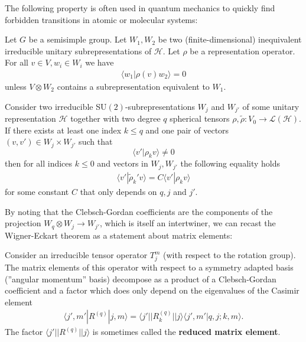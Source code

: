     The following property is often used in quantum mechanics to quickly find forbidden transitions in atomic or molecular systems:
    \begin{property}
        Let $G$ be a semisimple group. Let $W_1, W_2$ be two (finite-dimensional) inequivalent irreducible unitary subrepresentations of $\mathcal{H}$. Let $\rho$ be a representation operator. For all $v\in V, w_i\in W_i$ we have
        \begin{gather}
            \langle w_1|\rho(v)w_2\rangle = 0
        \end{gather}
        unless $V\otimes W_2$ contains a subrepresentation equivalent to $W_1$.
    \end{property}

    \begin{theorem}
        Consider two irreducible SU$(2)$-subrepresentations $W_j$ and $W_{j'}$ of some unitary representation $\mathcal{H}$ together with two degree $q$ spherical tensors $\rho, \tilde{\rho}:V_0\rightarrow\mathcal{L}(\mathcal{H})$. If there exists at least one index $k\leq q$ and one pair of vectors $(v, v')\in W_j\times W_{j'}$ such that \[\langle v'|\rho_k v\rangle\neq 0\] then for all indices $k\leq 0$ and vectors in $W_j, W_{j'}$ the following equality holds
        \begin{gather}
            \langle v'|\tilde{\rho}_k' v\rangle = C\langle v'|\rho_k v\rangle
        \end{gather}
        for some constant $C$ that only depends on $q, j$ and $j'$.
    \end{theorem}
    By noting that the Clebsch-Gordan coefficients are the components of the projection $W_q\otimes W_j\rightarrow W_{j'}$, which is itself an intertwiner, we can recast the Wigner-Eckart theorem as a statement about matrix elements:
    \begin{result}
        Consider an irreducible tensor operator $T_j^m$ (with respect to the rotation group). The matrix elements of this operator with respect to a symmetry adapted basis (''angular momentum'' basis) decompose as a product of a Clebsch-Gordan coefficient and a factor which does only depend on the eigenvalues of the Casimir element
        \begin{gather}
            \langle j', m'|R^{(q)}|j, m\rangle = \langle j'||R_k^{(q)}||j\rangle\langle j', m'|q,j;k,m\rangle.
        \end{gather}
        The factor $\langle j'||R^{(q)}||j\rangle$ is sometimes called the \textbf{reduced matrix element}.
    \end{result}